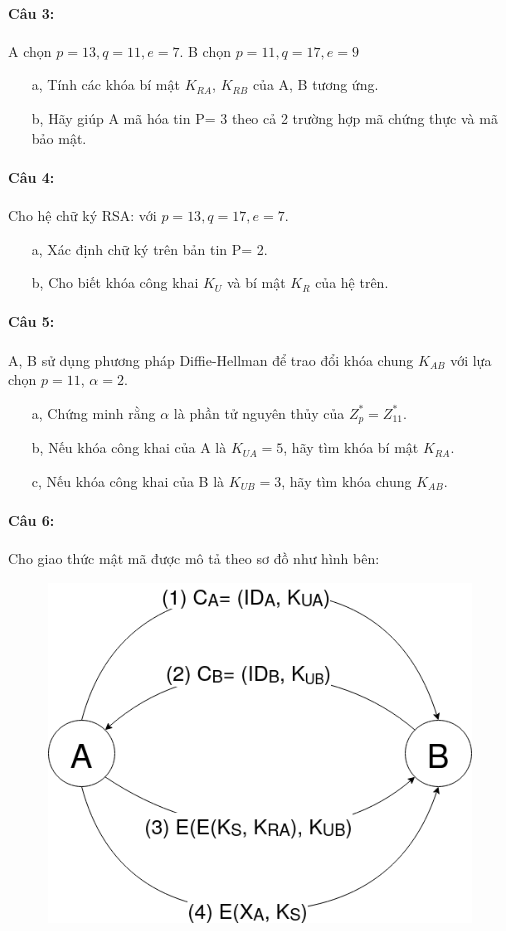 \documentclass[paper=a4, fontsize=11pt]{scrartcl}
\numberwithin{equation}{section}		%
\numberwithin{figure}{section}			%
\numberwithin{table}{section}				%
\begin{document}
	\paragraph{Câu 3:} A chọn $p= 13, q= 11, e= 7$. B chọn $p= 11, q= 17, e= 9$
	
	\begin{itemize}
		\item[a,] Tính các khóa bí mật $K_{RA}$, $K_{RB}$ của A, B tương ứng.
		\item[b,] Hãy giúp A mã hóa tin P= 3 theo cả 2 trường hợp mã chứng thực và mã bảo mật.
	\end{itemize}
	
	\paragraph{Câu 4:} Cho hệ chữ ký RSA: với $p= 13, q= 17, e= 7$.
	
	\begin{itemize}
		\item[a,] Xác định chữ ký trên bản tin P= 2.
		\item[b,] Cho biết khóa công khai $K_U$ và bí mật $K_R$ của hệ trên.
	\end{itemize}

	\paragraph{Câu 5:} A, B sử dụng phương pháp Diffie-Hellman để trao đổi khóa chung $K_{AB}$ với lựa chọn $p= 11$, $\alpha= 2$.
	
	\begin{itemize}
		\item[a,] Chứng minh rằng $\alpha$ là phần tử nguyên thủy của $Z_p^*= Z_{11}^*$.
		\item[b,] Nếu khóa công khai của A là $K_{UA}= 5$, hãy tìm khóa bí mật $K_{RA}$.
		\item[c,] Nếu khóa công khai của B là $K_{UB}= 3$, hãy tìm khóa chung $K_{AB}$.
	\end{itemize}

	\paragraph{Câu 6:} Cho giao thức mật mã được mô tả theo sơ đồ như hình bên:
	\begin{figure}[H]
		\centering
		\label{fig:sodobmtt}
		\includegraphics[width=0.7\linewidth]{SoDoBMTT}
	\end{figure}
	
\end{document}

